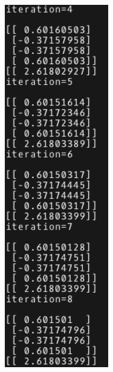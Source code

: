 \documentclass{article}
\begin{document}
\begin{figure}[H]
\begin{subfigure}[b]{0.49\textwidth}
        \includegraphics[width=0.5\textwidth]{p3a1.png}
    \end{subfigure}
\end{figure}
\end{document}
